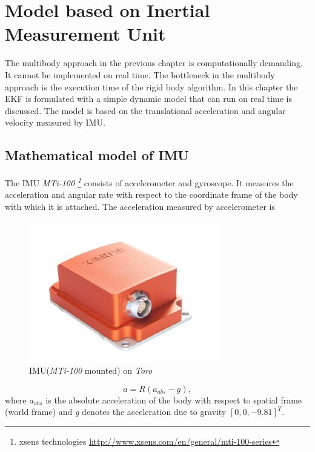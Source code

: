 \chapter{Model based on Inertial Measurement Unit}
\label{ch:simp_mdl}
The multibody approach in the previous chapter is computationally demanding. It cannot be implemented on real time. The bottleneck in the multibody approach is the execution time of the rigid body algorithm. In this chapter the EKF is formulated with a simple dynamic model that can run on real time is discussed. The model is based on the translational acceleration and angular velocity measured by IMU. 

\section{Mathematical model of IMU}
The IMU \emph{MTi-100 \footnote{xsens technologies \url{http://www.xsens.com/en/general/mti-100-series} }} consists of accelerometer and gyroscope. It measures the acceleration and angular rate with respect to the coordinate frame of the body with which it is attached. The acceleration measured by accelerometer is \citep{bloe12}
\begin{figure}
\begin{center}
\includegraphics[scale=0.75]{Bilder/pic_imu.png}
\caption{IMU(\emph{MTi-100} mounted) on \emph{Toro}}
\label{fig:toro_imu}
\end{center}
\end{figure}
\begin{equation}
    \label{eq:imu_acc}
    a = R(a_{abs} - g),
\end{equation}
where $a_{abs} $ is the absolute acceleration of the body with respect to spatial frame (world frame) and \emph{g} denotes the acceleration due to gravity $[0,0,-9.81]^T$.

